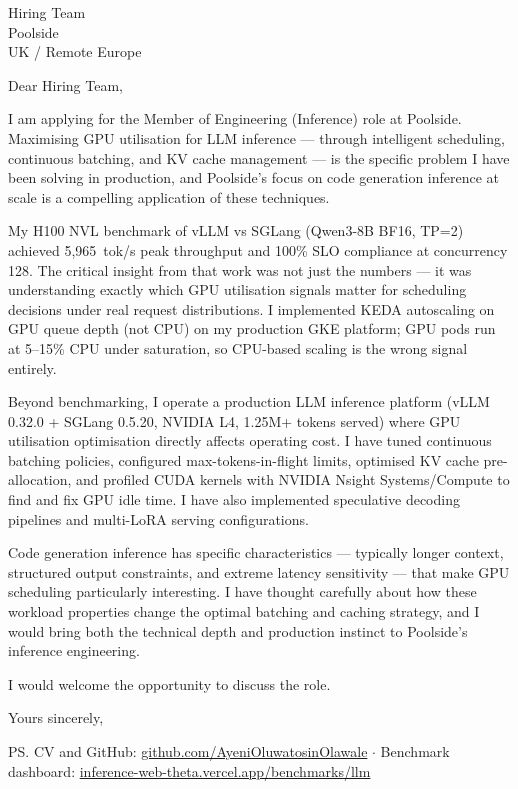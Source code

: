 \documentclass[12pt,a4paper]{letter}
\date{10 November 2026}
\begin{document}
\begin{letter}{Hiring Team \\ Poolside \\ UK / Remote Europe}

\opening{Dear Hiring Team,}

I am applying for the Member of Engineering (Inference) role at Poolside. Maximising GPU utilisation for LLM inference — through intelligent scheduling, continuous batching, and KV cache management — is the specific problem I have been solving in production, and Poolside's focus on code generation inference at scale is a compelling application of these techniques.

My H100 NVL benchmark of vLLM vs SGLang (Qwen3-8B BF16, TP=2) achieved 5,965~tok/s peak throughput and 100\% SLO compliance at concurrency 128. The critical insight from that work was not just the numbers — it was understanding exactly which GPU utilisation signals matter for scheduling decisions under real request distributions. I implemented KEDA autoscaling on GPU queue depth (not CPU) on my production GKE platform; GPU pods run at 5--15\% CPU under saturation, so CPU-based scaling is the wrong signal entirely.

Beyond benchmarking, I operate a production LLM inference platform (vLLM 0.32.0 + SGLang 0.5.20, NVIDIA L4, 1.25M+ tokens served) where GPU utilisation optimisation directly affects operating cost. I have tuned continuous batching policies, configured max-tokens-in-flight limits, optimised KV cache pre-allocation, and profiled CUDA kernels with NVIDIA Nsight Systems/Compute to find and fix GPU idle time. I have also implemented speculative decoding pipelines and multi-LoRA serving configurations.

Code generation inference has specific characteristics — typically longer context, structured output constraints, and extreme latency sensitivity — that make GPU scheduling particularly interesting. I have thought carefully about how these workload properties change the optimal batching and caching strategy, and I would bring both the technical depth and production instinct to Poolside's inference engineering.

I would welcome the opportunity to discuss the role.

\closing{Yours sincerely,}

\ps{CV and GitHub: \href{https://github.com/AyeniOluwatosinOlawale}{github.com/AyeniOluwatosinOlawale} $\cdot$ Benchmark dashboard: \href{https://inference-web-theta.vercel.app/benchmarks/llm}{inference-web-theta.vercel.app/benchmarks/llm}}

\end{letter}
\end{document}
